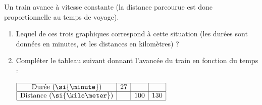
\begin{exercice}\label{exo2smath-0096}

    Un train avance à vitesse constante (la distance parcourue est donc proportionnelle au temps de voyage). 
    
    \begin{enumerate}
        \item
            
    Lequel de ces trois graphiques correspond à cette situation (les durées sont données en minutes, et les distances en kilomètres) ?

   
   
   

 \item

Compléter le tableau suivant donnant l'avancée du train en fonction du temps :
\begin{center}
$
    \begin{array}[]{|c|c|c|c|}
          \hline
          \text{Durée (\si{\minute})}&27&&\\
        \hline
        \text{Distance (\si{\kilo\meter})}&&100&130\\
          \hline
    \end{array}
    $
\end{center}
    \end{enumerate}

\end{exercice}
